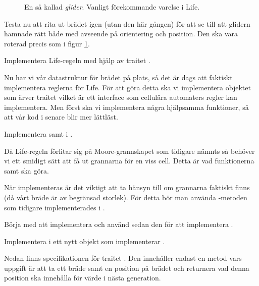 \begin{figure}[h]
  \begin{center}
  \end{center}
  \caption{En så kallad \textit{glider}. Vanligt förekommande varelse i Life.}
  \label{fig:threads:life:glider}
\end{figure}

Testa nu att rita ut brädet igen (utan  den här gången) för att se till att glidern hamnade rätt både med avseende på orientering och position. Den ska vara roterad precis som i figur \ref{fig:threads:life:glider}.


\Task Implementera Life-regeln med hjälp av traitet .

Nu har vi vår datastruktur för brädet på plats, så det är dags att faktiskt implementera reglerna för Life. För att göra detta ska vi implementera objektet  som ärver traitet  vilket är ett interface som cellulära automaters regler kan implementera. Men först ska vi implementera några hjälpsamma funktioner, så att vår kod i  senare blir mer lättläst.

\Subtask Implementera  samt  i .

Då Life-regeln förlitar sig på Moore-grannskapet som tidigare nämnts så behöver vi ett smidigt sätt att få ut grannarna för en viss cell. Detta är vad funktionerna  samt  ska göra.

När  implementeras är det viktigt att ta hänsyn till om grannarna faktiskt finns (då vårt bräde är av begränsad storlek).
För detta bör man använda -metoden som tidigare implementerades i .

Börja med att implementera  och använd sedan den för att implementera .

\Subtask Implementera  i ett nytt objekt  som implementerar .

Nedan finns specifikationen för traitet . Den innehåller endast en metod  vars uppgift är att ta ett bräde samt en position på brädet och returnera vad denna position ska innehålla för värde i nästa generation.

